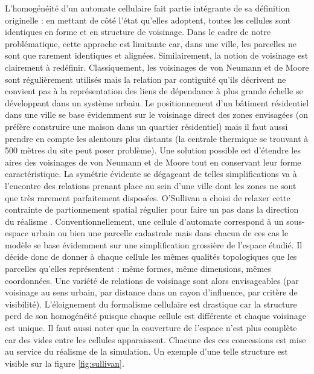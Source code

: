 \documentclass[12pt]{article}
\begin{document}
L'homogénéité d'un automate cellulaire fait partie intégrante de sa
définition originelle : en mettant de côté l'état qu'elles adoptent,
toutes les cellules sont identiques en forme et en structure de
voisinage. Dans le cadre de notre problématique, cette approche est
limitante car, dans une ville, les parcelles ne sont que rarement
identiques et alignées. Similairement, la notion de voisinage est
clairement à redéfinir. Classiquement, les voisinages de von Neumann
et de Moore sont régulièrement utilisés mais la relation par
contiguité qu'ils décrivent ne convient pas à la représentation des
liens de dépendance à plus grande échelle se développant dans un
système urbain. Le positionnement d'un bâtiment résidentiel dans une
ville se base évidemment sur le voisinage direct des zones envisagées
(on préfère construire une maison dans un quartier résidentiel) mais
il faut aussi prendre en compte les alentours plus distants (la
centrale thermique se trouvant à 500 mètres du site peut poser
problème). Une solution possible est d'étendre les aires des
voisinages de von Neumann et de Moore tout en conservant leur forme
caractéristique. La symétrie évidente se dégageant de telles
simplifications va à l'encontre des relations prenant place au sein
d'une ville dont les zones ne sont que très rarement parfaitement
disposées. O'Sullivan a choisi de relaxer cette contrainte de
partionnement spatial régulier pour faire un pas dans la direction du
réalisme \cite{O'Sullivan2000,O'Sullivan2001}. Conventionnellement,
une cellule d'automate correspond à un sous-espace urbain ou bien une
parcelle cadastrale mais dans chacun de ces cas le modèle se base
évidemment sur une simplification grossière de l'espace étudié. Il
décide donc de donner à chaque cellule les mêmes qualités topologiques
que les parcelles qu'elles représentent : même formes, même
dimensions, mêmes coordonnées. Une variété de relations de voisinage
sont alors envisageables (par voisinage au sens urbain, par distance
dans un rayon d'influence, par critère de visibilité). L'éloignement
du formalisme cellulaire est drastique car la structure perd de son
homogénéité puisque chaque cellule est différente et chaque voisinage
est unique. Il faut aussi noter que la couverture de l'espace n'est
plus complète car des vides entre les cellules apparaissent. Chacune
des ces concessions est mise au service du réalisme de la
simulation. Un exemple d'une telle structure est visible sur la figure
\ref{fig:sullivan}.
\end{document}
